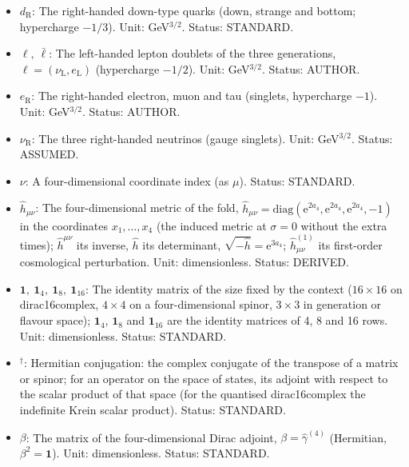 \documentclass[
  10pt,
]{article}
\begin{document}
\begin{itemize}
  \(u_{\mathrm{R}}\): The right-handed up-type quarks (up, charm and
  top; singlets of \(SU(2)_L\), hypercharge \(2/3\)). Unit:
  GeV\(^{3/2}\). Status: STANDARD.
\item
  \(d_{\mathrm{R}}\): The right-handed down-type quarks (down, strange
  and bottom; hypercharge \(-1/3\)). Unit: GeV\(^{3/2}\). Status:
  STANDARD.
\item
  \(\ell,\ \bar\ell\): The left-handed lepton doublets of the three
  generations, \(\ell = (\nu_{\mathrm{L}}, e_{\mathrm{L}})\)
  (hypercharge \(-1/2\)). Unit: GeV\(^{3/2}\). Status: AUTHOR.
\item
  \(e_{\mathrm{R}}\): The right-handed electron, muon and tau (singlets,
  hypercharge \(-1\)). Unit: GeV\(^{3/2}\). Status: AUTHOR.
\item
  \(\nu_{\mathrm{R}}\): The three right-handed neutrinos (gauge
  singlets). Unit: GeV\(^{3/2}\). Status: ASSUMED.
\item
  \(\nu\): A four-dimensional coordinate index (as \(\mu\)). Status:
  STANDARD.
\item
  \(\hat h_{\mu\nu}\): The four-dimensional metric of the fold,
  \(\hat h_{\mu\nu} = \mathrm{diag}(\mathrm{e}^{2a_4}, \mathrm{e}^{2a_4}, \mathrm{e}^{2a_4}, -1)\)
  in the coordinates \(x_1, \dots, x_4\) (the induced metric at
  \(\sigma = 0\) without the extra times); \(\hat h^{\mu\nu}\) its
  inverse, \(\hat h\) its determinant,
  \(\sqrt{-\hat h} = \mathrm{e}^{3a_4}\); \(\hat h^{(1)}_{\mu\nu}\) its
  first-order cosmological perturbation. Unit: dimensionless. Status:
  DERIVED.
\item
  \(\mathbf{1},\ \mathbf{1}_4,\ \mathbf{1}_8,\ \mathbf{1}_{16}\): The
  identity matrix of the size fixed by the context (\(16 \times 16\) on
  dirac16complex, \(4 \times 4\) on a four-dimensional spinor,
  \(3 \times 3\) in generation or flavour space); \(\mathbf{1}_4\),
  \(\mathbf{1}_8\) and \(\mathbf{1}_{16}\) are the identity matrices of
  4, 8 and 16 rows. Unit: dimensionless. Status: STANDARD.
\item
  \({}^\dagger\): Hermitian conjugation: the complex conjugate of the
  transpose of a matrix or spinor; for an operator on the space of
  states, its adjoint with respect to the scalar product of that space
  (for the quantised dirac16complex the indefinite Krein scalar
  product). Status: STANDARD.
\item
  \(\beta\): The matrix of the four-dimensional Dirac adjoint,
  \(\beta = \hat\gamma^{(4)}\) (Hermitian, \(\beta^2 = \mathbf{1}\)).
  Unit: dimensionless. Status: STANDARD.

\end{itemize}
\end{document}
